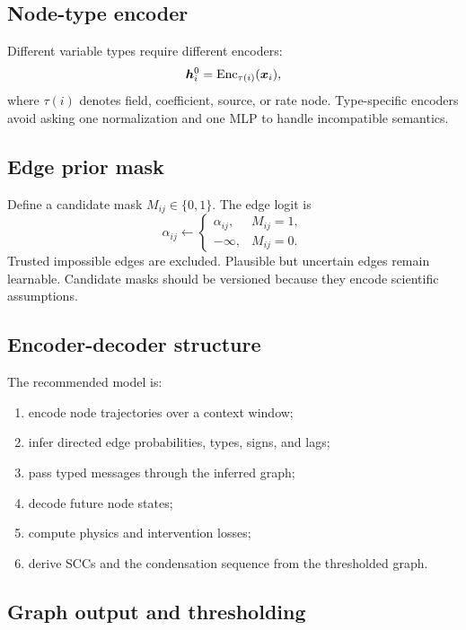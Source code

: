 \documentclass[11pt]{article}
\newcommand{\hvec}{\bm{h}}
\newcommand{\Enc}{\operatorname{Enc}}
\begin{document}
\subsection{Node-type encoder}

Different variable types require different encoders:
\begin{equation}
\hvec_i^0=\Enc_{\tau(i)}(\xvec_i),
\end{equation}
where \(\tau(i)\) denotes field, coefficient, source, or rate node. Type-specific encoders avoid asking one normalization and one MLP to handle incompatible semantics.

\subsection{Edge prior mask}

Define a candidate mask \(M_{ij}\in\{0,1\}\). The edge logit is
\begin{equation}
\alpha_{ij}\leftarrow
\begin{cases}
\alpha_{ij}, & M_{ij}=1,\\
-\infty, & M_{ij}=0.
\end{cases}
\end{equation}
Trusted impossible edges are excluded. Plausible but uncertain edges remain learnable. Candidate masks should be versioned because they encode scientific assumptions.

\subsection{Encoder-decoder structure}

The recommended model is:
\begin{enumerate}[leftmargin=1.6em]
    \item encode node trajectories over a context window;
    \item infer directed edge probabilities, types, signs, and lags;
    \item pass typed messages through the inferred graph;
    \item decode future node states;
    \item compute physics and intervention losses;
    \item derive SCCs and the condensation sequence from the thresholded graph.
\end{enumerate}

\subsection{Graph output and thresholding}
\end{document}

